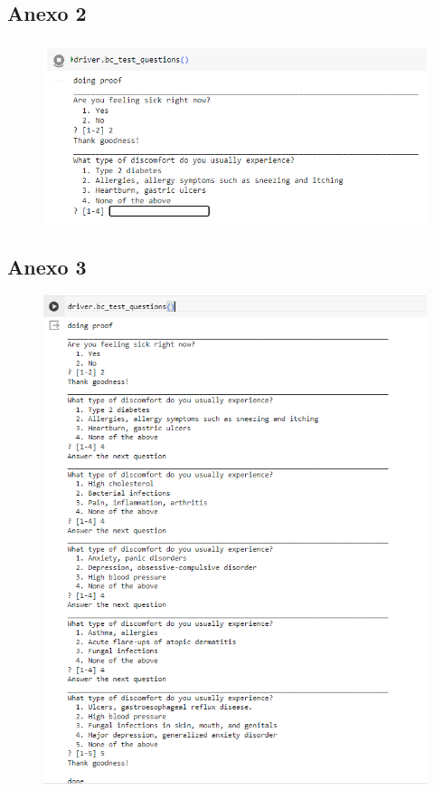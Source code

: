 \documentclass[11pt]{article}
\begin{document}
\subsection{Anexo 2}
\begin{figure}[H]
  \centering
  \includegraphics[width=\linewidth]{Graphs/imagen1.png}
  \label{fig:imagen1}
\end{figure}

\subsection{Anexo 3}
\begin{figure}[H]
  \centering
  \includegraphics[width=\linewidth]{Graphs/imagen2.png}
  \label{fig:imagen2}
\end{figure}
\end{document}
